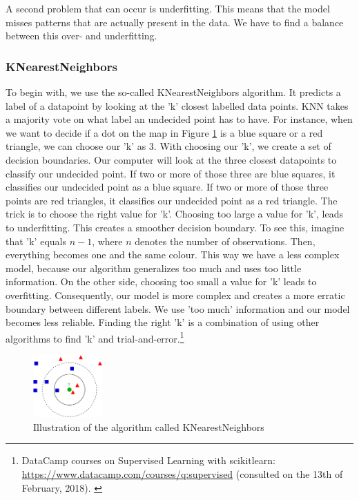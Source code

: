 \documentclass[11pt]{article}
\begin{document}
A second problem that can occur is underfitting. This means that the model misses patterns that are actually present in the data. We have to find a balance between this over- and underfitting. 


\subsubsection{KNearestNeighbors}
\label{sec:org4d2bf9b}

To begin with, we use the so-called KNearestNeighbors algorithm. It predicts a label of a datapoint by looking at the 'k' closest labelled data points. KNN takes a majority vote on what label an undecided point has to have. For instance, when we want to decide if a dot on the map in Figure \ref{tab:knn} is a blue square or a red triangle, we can choose our 'k' as 3. With choosing our 'k', we create a set of decision boundaries. Our computer will look at the three closest datapoints to classify our undecided point. If two or more of those three are blue squares, it classifies our undecided point as a blue square. If two or more of those three points are red triangles, it classifies our undecided point as a red triangle. The trick is to choose the right value for 'k'. Choosing too large a value for 'k', leads to underfitting. This creates a smoother decision boundary. To see this, imagine that 'k' equals \(n-1\), where \(n\) denotes the number of observations. Then, everything becomes one and the same colour. This way we have a less complex model, because our algorithm generalizes too much and uses too little information. On the other side, choosing too small a value for 'k' leads to overfitting. Consequently, our model is more complex and creates a more erratic boundary between different labels. We use 'too much' information and our model becomes less reliable.  Finding the right 'k' is a combination of using other algorithms to find 'k' and trial-and-error.\footnote{DataCamp courses on Supervised Learning with scikitlearn: \url{https://www.datacamp.com/courses/q:supervised} (consulted on the 13th of February, 2018). \label{fn:datacamp}}

\begin{figure}[htbp]
\centering
\includegraphics[width=100px]{./KnnClassification.png}
\caption{\label{tab:knn}
Illustration of the algorithm called KNearestNeighbors}
\end{figure} 
\end{document}
